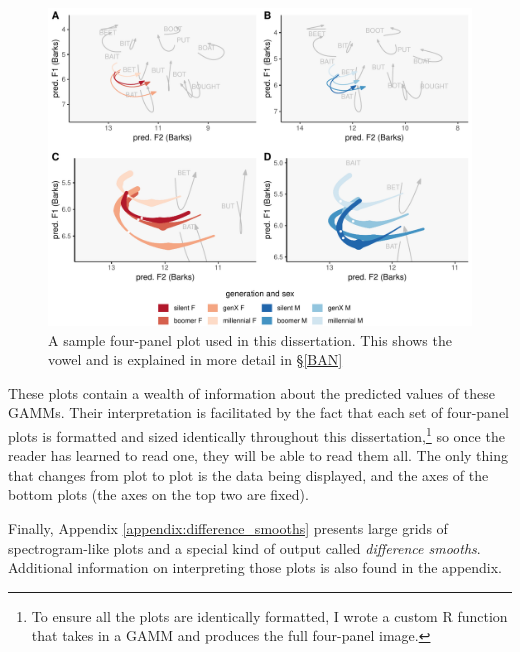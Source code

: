 \begin{figure}[tb!]
    \centering
    \includegraphics[width = 6.5in]{Figures/BAN/BAN_four_panel_plot.pdf}
    \caption[A sample four-panel plot used in this dissertation.]{A sample four-panel plot used in this dissertation. This shows the \ban vowel and is explained in more detail in \S\ref{BAN}}
    \label{fig:sample_four_panel_plot}
\end{figure}

These plots contain a wealth of information about the predicted values of these GAMMs. Their interpretation is facilitated by the fact that each set of four-panel plots is formatted and sized identically throughout this dissertation,\footnote{To ensure all the plots are identically formatted, I wrote a custom R function that takes in a GAMM and produces the full four-panel image.} so once the reader has learned to read one, they will be able to read them all. The only thing that changes from plot to plot is the data being displayed, and the axes of the bottom plots (the axes on the top two are fixed).

Finally, Appendix \ref{appendix:difference_smooths} presents large grids of spectrogram-like plots and a special kind of output called \textit{difference smooths}. Additional information on interpreting those plots is also found in the appendix.



